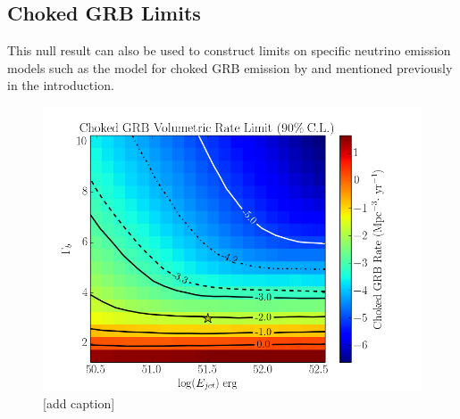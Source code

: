 \documentclass[manuscript]{aastex}
\begin{document}
\subsection{Choked GRB Limits}
This null result can also be used to construct limits on specific neutrino emission models such as the model for choked GRB emission by \cite{2004PhRvL..93r1101R} and \cite{2005PhRvL..95f1103A} mentioned previously in the introduction.
\begin{figure}[ht]
  \begin{center}
    \includegraphics[width=1.0\textwidth,keepaspectratio]{plots/RateLimit_2DHisto_wContours_SysAdj.png}
  \end{center}
  \caption[Choked GRB Volumetric Rate Limit]{[add caption]}
  \label{fig:VolumetricRateLimit}
\end{figure}
\acknowledgments




{}

\clearpage

\end{document}
